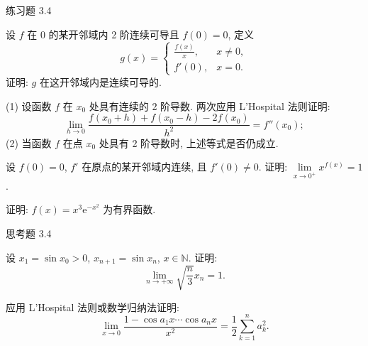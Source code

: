 \begin{exblock}{练习题 3.4}
  \item 设 $f$ 在 $0$ 的某开邻域内 2 阶连续可导且 $f(0)=0$, 定义
  \[
  g(x)=\begin{cases}\frac{f(x)}{x}, & x\neq0,\\ f'(0), & x=0.\end{cases}
\]
  证明: $g$ 在这开邻域内是连续可导的.

  \item (1) 设函数 $f$ 在 $x_0$ 处具有连续的 2 阶导数. 两次应用 L'Hospital 法则证明:
  \[
  \lim_{h\to0}\frac{f(x_0+h)+f(x_0-h)-2f(x_0)}{h^{2}}=f''(x_0);
\]
  (2) 当函数 $f$ 在点 $x_0$ 处具有 2 阶导数时, 上述等式是否仍成立.

  \item 设 $f(0)=0$, $f'$ 在原点的某开邻域内连续, 且 $f'(0)\neq0$. 证明: $\lim\limits_{x\to0^{+}}x^{f(x)}=1$.

  \item 证明: $f(x)=x^{3}\mathrm{e}^{-x^{2}}$ 为有界函数.
\end{exblock}

\begin{exblock}{思考题 3.4}
  \item 设 $x_1=\sin x_0>0$, $x_{n+1}=\sin x_n$, $x\in\mathbb{N}$. 证明:
  \[
  \lim_{n\to+\infty}\sqrt{\frac{n}{3}}x_n=1.
\]

  \item 应用 L'Hospital 法则或数学归纳法证明:
  \[
  \lim_{x\to0}\frac{1-\cos a_1x\cdots\cos a_nx}{x^{2}}=\frac{1}{2}\sum_{k=1}^{n}a_k^{2}.
\]
\end{exblock}
